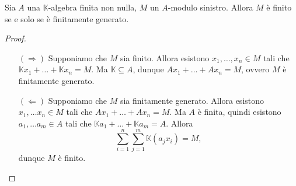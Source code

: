 \begin{proposition}
Sia $A$ una $\mathbb{K}$-algebra finita non nulla, $M$ un $A$-modulo sinistro. Allora $M$ è finito se e solo se è finitamente generato.
\end{proposition}
\begin{proof}
\leavevmode
\begin{itemize}
\item[$(\Rightarrow)$] Supponiamo che $M$ sia finito. Allora esistono $x_1,\ldots, x_n\in M$ tali che $\mathbb{K}x_1+\ldots+\mathbb{K}x_n=M$. Ma $\mathbb{K}\subseteq A$, dunque $Ax_1+\ldots+Ax_n=M$, ovvero $M$ è finitamente generato.
\item[$(\Leftarrow)$] Supponiamo che $M$ sia finitamente generato. Allora esistono $x_1,\ldots x_n\in M$ tali che $Ax_1+\ldots+Ax_n=M$. Ma $A$ è finita, quindi esistono $a_1,\ldots a_m\in A$ tali che $\mathbb{K}a_1+\ldots+\mathbb{K}a_m=A$. Allora
$$
\sum_{i=1}^{n}\sum_{j=1}^{m}\mathbb{K}(a_jx_i)=M,
$$
dunque $M$ è finito.
\end{itemize}
\end{proof}



